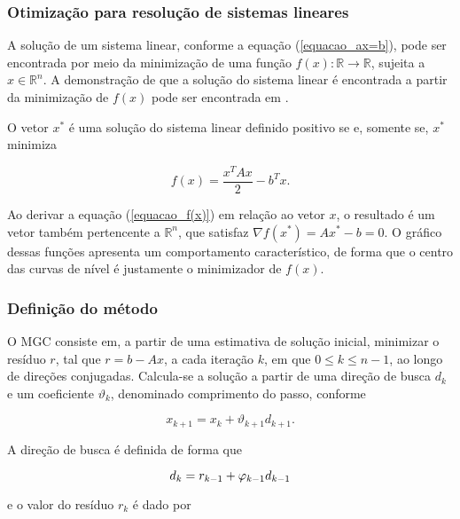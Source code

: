 \subsubsection{Otimização para resolução de sistemas lineares} \label{cap_otimizacao}

A solução de um sistema linear, conforme a equação (\ref{equacao_ax=b}), pode ser encontrada por meio da minimização de uma função $f(x) : \mathbb{R} \rightarrow \mathbb{R}$, sujeita a $x \in \mathbb{R}^n$. A demonstração de que a solução do sistema linear é encontrada a partir da minimização de $f(x)$ pode ser encontrada em . 

O vetor $x^*$ é uma solução do sistema linear definido positivo se e, somente se, $x^*$ minimiza

\begin{equation}
f(x)=\frac{x^TAx}{2} -b^Tx.
\label{equacao_f(x)}
\end{equation}

Ao derivar a equação (\ref{equacao_f(x)}) em relação ao vetor $x$, o resultado é um vetor também pertencente a $\mathbb{R}^n$, que satisfaz $\nabla {f(x^*)={Ax^*} -b = 0}$. O gráfico dessas funções apresenta um comportamento característico, de forma que o centro das curvas de nível é justamente o minimizador de $f(x)$.

\subsubsection{Definição do método} \label{cap_construcao}

O MGC consiste em, a partir de uma estimativa de solução inicial, minimizar o resíduo $r$, tal que $r = b - Ax$, a cada iteração $k$, em que $0 \leq k \leq n-1$, ao longo de direções conjugadas.  
Calcula-se a solução a partir de uma direção de busca $d_k$ e um coeficiente $\vartheta_k$, denominado comprimento do passo, conforme

\begin{equation} 
x_{k+1} = x_k + \vartheta_{k+1} d_{k+1}.
\label{equacao_xk}
\end{equation}

A direção de busca é definida de forma que

\begin{equation}
 d_k = r_{k-1} + \varphi_{k-1} d_{k-1} \\
\label{equacao_d_k}
\end{equation}

\noindent e o valor do resíduo $r_k$ é dado por

